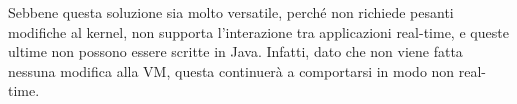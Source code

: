 Sebbene questa soluzione sia molto versatile, perché non richiede pesanti modifiche al kernel, non supporta l'interazione tra applicazioni real-time, e queste ultime non possono essere scritte in Java. Infatti, dato che non viene fatta nessuna modifica alla VM, questa continuerà a comportarsi in modo non real-time.